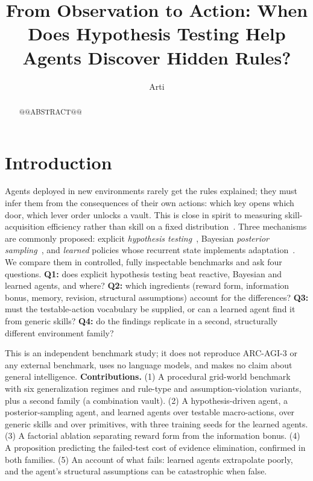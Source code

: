 \documentclass[runningheads]{llncs}
\begin{document}
\title{From Observation to Action: When Does Hypothesis Testing Help Agents Discover Hidden Rules?}
\author{Arti}
\maketitle

\begin{abstract}
@@ABSTRACT@@
\end{abstract}

\section{Introduction}
Agents deployed in new environments rarely get the rules explained; they must infer them from the consequences of their own actions: which key opens which door, which lever order unlocks a vault. This is close in spirit to measuring skill-acquisition efficiency rather than skill on a fixed distribution~\cite{chollet2019}. Three mechanisms are commonly proposed: explicit \emph{hypothesis testing}~\cite{klahr1988,gopnik1997,tenenbaum2011}, Bayesian \emph{posterior sampling}~\cite{strens2000,osband2013}, and \emph{learned} policies whose recurrent state implements adaptation~\cite{duan2016,wang2016}. We compare them in controlled, fully inspectable benchmarks and ask four questions. \textbf{Q1:} does explicit hypothesis testing beat reactive, Bayesian and learned agents, and where? \textbf{Q2:} which ingredients (reward form, information bonus, memory, revision, structural assumptions) account for the differences? \textbf{Q3:} must the testable-action vocabulary be supplied, or can a learned agent find it from generic skills? \textbf{Q4:} do the findings replicate in a second, structurally different environment family?

This is an independent benchmark study; it does not reproduce ARC-AGI-3 or any external benchmark, uses no language models, and makes no claim about general intelligence. \textbf{Contributions.} (1) A procedural grid-world benchmark with six generalization regimes and rule-type and assumption-violation variants, plus a second family (a combination vault). (2) A hypothesis-driven agent, a posterior-sampling agent, and learned agents over testable macro-actions, over generic skills and over primitives, with three training seeds for the learned agents. (3) A factorial ablation separating reward form from the information bonus. (4) A proposition predicting the failed-test cost of evidence elimination, confirmed in both families. (5) An account of what fails: learned agents extrapolate poorly, and the agent's structural assumptions can be catastrophic when false.
\end{document}

